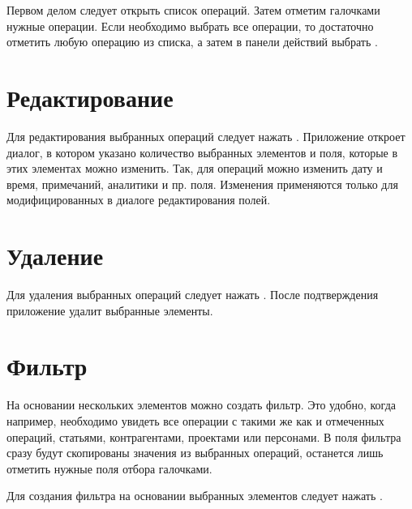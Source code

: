 \documentclass[a4paper,10pt,russian]{sphinxmanual}
\begin{document}
\sphinxAtStartPar
Первом делом следует открыть список операций. Затем отметим галочками нужные операции. Если необходимо выбрать все
операции, то достаточно отметить любую операцию из списка, а затем в панели действий выбрать .


\section{Редактирование}
\label{\detokenize{bulk-actions:id3}}
\sphinxAtStartPar
Для редактирования выбранных операций следует нажать . Приложение откроет диалог, в котором
указано количество выбранных элементов и поля, которые в этих элементах можно изменить. Так, для операций можно изменить
дату и время, примечаний, аналитики и пр. поля. Изменения применяются только для модифицированных в диалоге редактирования
полей.

\noindent{}
\noindent{}


\section{Удаление}
\label{\detokenize{bulk-actions:id4}}
\sphinxAtStartPar
Для удаления выбранных операций следует нажать . После подтверждения приложение удалит выбранные элементы.

\noindent{}
\noindent{}


\section{Фильтр}
\label{\detokenize{bulk-actions:id5}}
\sphinxAtStartPar
На основании нескольких элементов можно создать фильтр. Это удобно, когда например, необходимо увидеть все операции с
такими же как и отмеченных операций, статьями, контрагентами, проектами или персонами. В поля фильтра сразу будут скопированы
значения из выбранных операций, останется лишь отметить нужные поля отбора галочками.

\sphinxAtStartPar
Для создания фильтра на основании выбранных элементов следует нажать .
\end{document}
